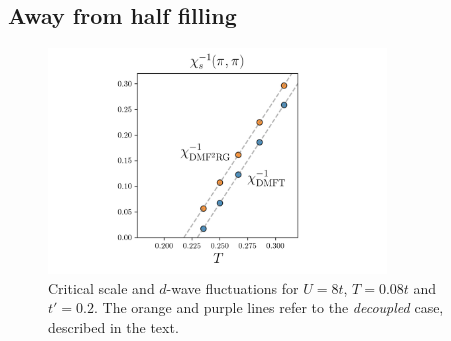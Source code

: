 \documentclass[paper=a4, fontsize=11pt]{scrartcl} %
\numberwithin{equation}{section} %
\numberwithin{figure}{section} %
\numberwithin{table}{section} %
\begin{document}
\subsection{Away from half filling}

\begin{figure}[t!]
\begin{center}
\includegraphics[width=0.8\textwidth]{plots/extrapolate_susc.png}
\caption{Critical scale and $d$-wave fluctuations for $U=8t$, $T=0.08t$ and $t'=0.2$. The orange and purple lines refer to the \textit{decoupled} case, described in the text.} 
\label{fig:phasediag} 
\end{center}
\end{figure}
\end{document}
